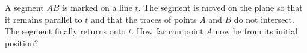 A segment $AB$ is marked on a line $t$. The segment is moved on the plane so that it remains parallel to $t$ and that the traces of points $A$ and $B$ do not intersect. The segment finally returns onto $t$. How far can point $A$ now be from its initial position?